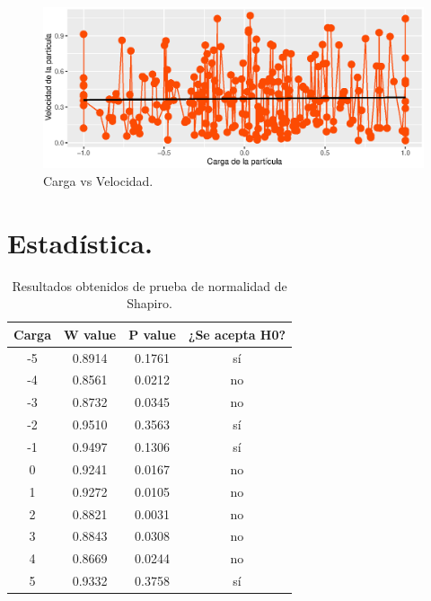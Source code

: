 \documentclass{article}
\begin{document}
\begin{figure}[htb] %
    \centering
    \includegraphics[width=150mm]{velvscar.eps} %
    \caption{Carga vs Velocidad.}
    \label{Figura 3}
\end{figure}

\section{Estad\'istica.}

\begin{table}[ht]
    \centering
    \caption{Resultados obtenidos de prueba de normalidad de Shapiro.} 
    \begin{tabular}{|c|c|c|c|}
    \hline
    Carga & W value & P value & ¿Se acepta H0?  \\
    \hline
    -5 & 0.8914 & 0.1761 & s\'i \\
    \hline 
     -4 & 0.8561 & 0.0212 & no  \\
    \hline 
    -3 & 0.8732 & 0.0345 & no \\
    \hline 
    -2 & 0.9510 & 0.3563 & s\'i \\
    \hline
    -1 & 0.9497 & 0.1306 & s\'i \\
    \hline
    0 & 0.9241 & 0.0167 & no \\
    \hline
    1 & 0.9272 & 0.0105 & no \\
    \hline
    2 & 0.8821 & 0.0031 & no \\
    \hline
    3 & 0.8843 & 0.0308 & no \\
    \hline
    4 & 0.8669 & 0.0244 & no \\
    \hline
    5 & 0.9332 & 0.3758 & s\'i \\
    \hline
\end{tabular}
    \label{cuadro 1}
\end{table}
\end{document}
